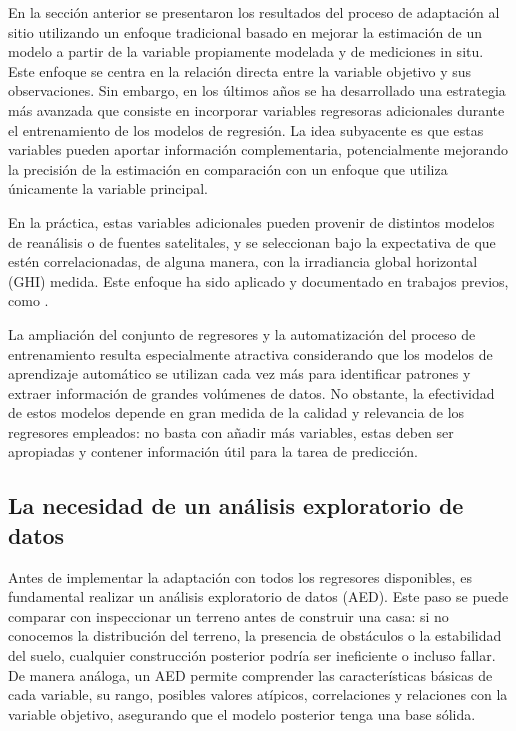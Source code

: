 \documentclass[letterpaper,12pt, twoside]{report}
\providecommand{\DIFdeltex}[1]{{\protect\color{red} \scriptsize #1}} %
\providecommand{\DIFdel}[1]{\texorpdfstring{\DIFdeltex{#1}}{}} %
\begin{document}
\DIFdel{En la sección anterior se presentaron los resultados del proceso de adaptación al sitio utilizando un enfoque tradicional basado en mejorar la estimación de un modelo a partir de la variable propiamente modelada y de mediciones in situ. Este enfoque se centra en la relación directa entre la variable objetivo y sus observaciones. Sin embargo, en los últimos años se ha desarrollado una estrategia más avanzada que consiste en incorporar variables regresoras adicionales durante el entrenamiento de los modelos de regresión. La idea subyacente es que estas variables pueden aportar información complementaria, potencialmente mejorando la precisión de la estimación en comparación con un enfoque que utiliza únicamente la variable principal. 
}%

\DIFdel{En la práctica, estas variables adicionales pueden provenir de distintos modelos de reanálisis o de fuentes satelitales, y se seleccionan bajo la expectativa de que estén correlacionadas, de alguna manera, con la irradiancia global horizontal (GHI) medida. Este enfoque ha sido aplicado y documentado en trabajos previos, como \cite{Salazar2025, Miranda2021, Miranda2023}.
}%

\DIFdel{La ampliación del conjunto de regresores y la automatización del proceso de entrenamiento resulta especialmente atractiva considerando que los modelos de aprendizaje automático se utilizan cada vez más para identificar patrones y extraer información de grandes volúmenes de datos. No obstante, la efectividad de estos modelos depende en gran medida de la calidad y relevancia de los regresores empleados: no basta con añadir más variables, estas deben ser apropiadas y contener información útil para la tarea de predicción.
}%

\subsection{\DIFdel{La necesidad de un análisis exploratorio de datos}}
\addtocounter{subsection}{-1}%

\DIFdel{Antes de implementar la adaptación con todos los regresores disponibles, es fundamental realizar un análisis exploratorio de datos (AED). Este paso se puede comparar con inspeccionar un terreno antes de construir una casa: si no conocemos la distribución del terreno, la presencia de obstáculos o la estabilidad del suelo, cualquier construcción posterior podría ser ineficiente o incluso fallar. De manera análoga, un AED permite comprender las características básicas de cada variable, su rango, posibles valores atípicos, correlaciones y relaciones con la variable objetivo, asegurando que el modelo posterior tenga una base sólida.  
}%
\end{document}
